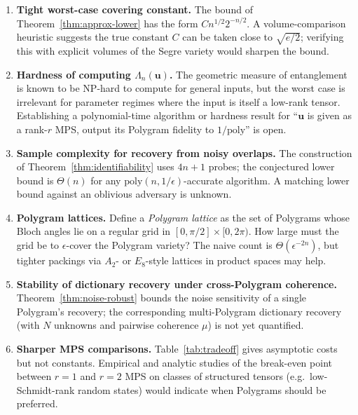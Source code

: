 \documentclass[11pt,letterpaper]{article}
\theoremstyle{definition}
\begin{document}
\begin{enumerate}[leftmargin=*, itemsep=4pt]
\item \textbf{Tight worst-case covering constant.} The bound of
      Theorem~\ref{thm:approx-lower} has the form $C n^{1/2} 2^{-n/2}$.
      A volume-comparison heuristic suggests the true constant $C$ can be
      taken close to $\sqrt{e/2}$; verifying this with explicit volumes of
      the Segre variety would sharpen the bound.

\item \textbf{Hardness of computing $\Lambda_{n}(\bm{u})$.} The geometric
      measure of entanglement is known to be NP-hard to compute for
      general inputs, but the worst case is irrelevant for parameter
      regimes where the input is itself a low-rank tensor. Establishing a
      polynomial-time algorithm or hardness result for ``$\bm{u}$ is given as
      a rank-$r$ MPS, output its Polygram fidelity to $1/\mathrm{poly}$'' is
      open.

\item \textbf{Sample complexity for recovery from noisy overlaps.} The
      construction of Theorem~\ref{thm:identifiability} uses $4n + 1$
      probes; the conjectured lower bound is $\Theta(n)$ for any
      $\mathrm{poly}(n, 1/\epsilon)$-accurate algorithm. A matching lower bound
      against an oblivious adversary is unknown.

\item \textbf{Polygram lattices.} Define a \emph{Polygram lattice} as the
      set of Polygrams whose Bloch angles lie on a regular grid in
      $[0, \pi/2] \times [0, 2\pi)$. How large must the grid be to
      $\epsilon$-cover the Polygram variety? The naive count is
      $\Theta(\epsilon^{-2n})$, but tighter packings via $A_{2}$- or
      $E_{8}$-style lattices in product spaces may help.

\item \textbf{Stability of dictionary recovery under cross-Polygram
      coherence.} Theorem~\ref{thm:noise-robust} bounds the noise
      sensitivity of a single Polygram's recovery; the corresponding
      multi-Polygram dictionary recovery (with $N$ unknowns and pairwise
      coherence $\mu$) is not yet quantified.

\item \textbf{Sharper MPS comparisons.} Table~\ref{tab:tradeoff} gives
      asymptotic costs but not constants. Empirical and analytic studies
      of the break-even point between $r = 1$ and $r = 2$ MPS on classes
      of structured tensors (e.g.\ low-Schmidt-rank random states) would
      indicate when Polygrams should be preferred.


\end{enumerate}
\end{document}
